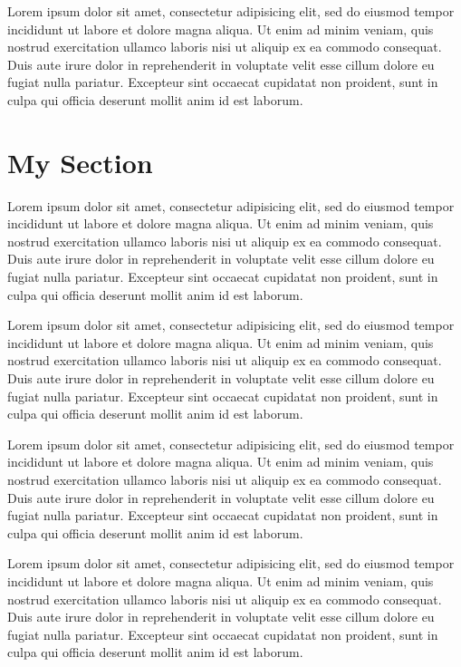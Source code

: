 \documentclass[withindex,glossary]{cam-thesis}
\begin{document}
Lorem ipsum dolor sit amet, consectetur adipisicing elit, sed do eiusmod tempor incididunt ut labore et dolore magna aliqua. Ut enim ad minim veniam, quis nostrud exercitation ullamco laboris nisi ut aliquip ex ea commodo consequat. Duis aute irure dolor in reprehenderit in voluptate velit esse cillum dolore eu fugiat nulla pariatur. Excepteur sint occaecat cupidatat non proident, sunt in culpa qui officia deserunt mollit anim id est laborum.

\section{My Section}

Lorem ipsum dolor sit amet, consectetur adipisicing elit, sed do eiusmod tempor incididunt ut labore et dolore magna aliqua. Ut enim ad minim veniam, quis nostrud exercitation ullamco laboris nisi ut aliquip ex ea commodo consequat. Duis aute irure dolor in reprehenderit in voluptate velit esse cillum dolore eu fugiat nulla pariatur. Excepteur sint occaecat cupidatat non proident, sunt in culpa qui officia deserunt mollit anim id est laborum.

Lorem ipsum dolor sit amet, consectetur adipisicing elit, sed do eiusmod tempor incididunt ut labore et dolore magna aliqua. Ut enim ad minim veniam, quis nostrud exercitation ullamco laboris nisi ut aliquip ex ea commodo consequat. Duis aute irure dolor in reprehenderit in voluptate velit esse cillum dolore eu fugiat nulla pariatur. Excepteur sint occaecat cupidatat non proident, sunt in culpa qui officia deserunt mollit anim id est laborum.

Lorem ipsum dolor sit amet, consectetur adipisicing elit, sed do eiusmod tempor incididunt ut labore et dolore magna aliqua. Ut enim ad minim veniam, quis nostrud exercitation ullamco laboris nisi ut aliquip ex ea commodo consequat. Duis aute irure dolor in reprehenderit in voluptate velit esse cillum dolore eu fugiat nulla pariatur. Excepteur sint occaecat cupidatat non proident, sunt in culpa qui officia deserunt mollit anim id est laborum.

Lorem ipsum dolor sit amet, consectetur adipisicing elit, sed do eiusmod tempor incididunt ut labore et dolore magna aliqua. Ut enim ad minim veniam, quis nostrud exercitation ullamco laboris nisi ut aliquip ex ea commodo consequat. Duis aute irure dolor in reprehenderit in voluptate velit esse cillum dolore eu fugiat nulla pariatur. Excepteur sint occaecat cupidatat non proident, sunt in culpa qui officia deserunt mollit anim id est laborum.
\end{document}
